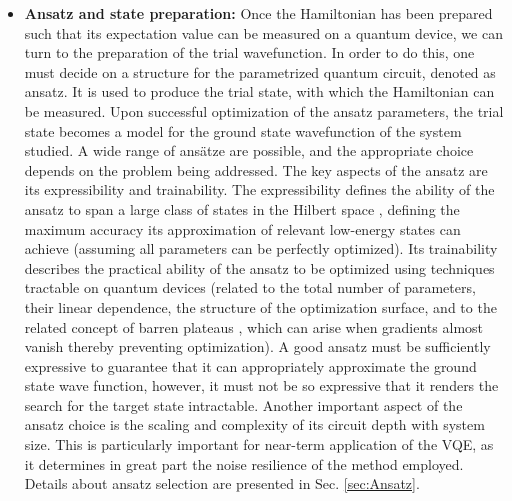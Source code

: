 \begin{itemize}
    \item \textbf{Ansatz and state preparation:} Once the Hamiltonian has been prepared such that its expectation value can be measured on a quantum device, we can turn to the preparation of the trial wavefunction. In order to do this, one must decide on a structure for the parametrized quantum circuit, denoted as ansatz. It is used to produce the trial state, with which the Hamiltonian can be measured. Upon successful optimization of the ansatz parameters, the trial state becomes a model for the ground state wavefunction of the system studied. A wide range of ans{\"{a}}tze are possible, and the appropriate choice depends on the problem being addressed. The key aspects of the ansatz are its expressibility and trainability. The expressibility defines the ability of the ansatz to span a large class of states in the Hilbert space \cite{Holmes2021, Nakaji2021}, defining the maximum accuracy its approximation of relevant low-energy states can achieve (assuming all parameters can be perfectly optimized). Its trainability describes the practical ability of the ansatz to be optimized using techniques tractable on quantum devices \cite{Cerezo2021_BP, Holmes2021} (related to the total number of parameters, their linear dependence, the structure of the optimization surface, and to the related concept of barren plateaus \cite{McClean2018}, which can arise when gradients almost vanish thereby preventing optimization). A good ansatz must be sufficiently expressive to guarantee that it can appropriately approximate the ground state wave function, however, it must not be so expressive that it renders the search for the target state intractable. Another important aspect of the ansatz choice is the scaling and complexity of its circuit depth with system size. This is particularly important for near-term application of the VQE, as it determines in great part the noise resilience of the method employed. Details about ansatz selection are presented in Sec. \ref{sec:Ansatz}. 

\end{itemize}

